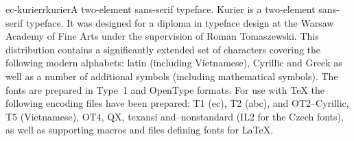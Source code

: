 \documentclass{ddltxtyp}
\begin{document}
\begin{package}{ec-kurierr}{kurier}{A two-element sans-serif typeface.}
Kurier is a two-element sans-serif typeface. It was designed
for a diploma in typeface design at the Warsaw Academy of Fine
Arts under the supervision of Roman Tomaszewski. This
distribution contains a significantly extended set of
characters covering the following modern alphabets: latin
(including Vietnamese), Cyrillic and Greek as well as a number
of additional symbols (including mathematical symbols). The
fonts are prepared in Type~1 and OpenType formats. For use with
TeX the following encoding files have been prepared: T1 (ec),
T2 (abc), and OT2--Cyrillic, T5 (Vietnamese), OT4, QX, texansi
and--nonstandard (IL2 for the Czech fonts), as well as
supporting macros and files defining fonts for {\LaTeX}.
\end{package}

\end{document}
